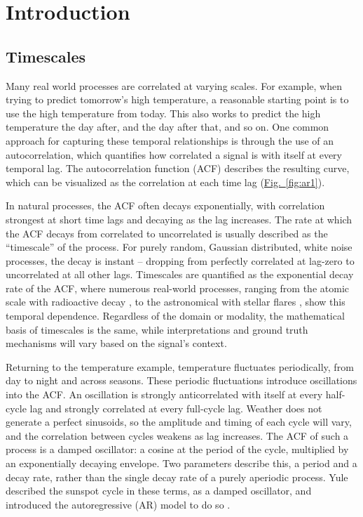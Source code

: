 \documentclass[pdflatex,lineno,sn-nature]{sn-jnl}
\newcommand{\figpanel}[3][]{\hyperref[#2]{Fig.~#1\ref*{#2}#3}}
\theoremstyle{thmstyleone}
\theoremstyle{thmstyletwo}
\theoremstyle{thmstylethree}
\begin{document}
\maketitle

\section{Introduction}\label{sec:intro}

\subsection{Timescales}\label{sec:timescales}

Many real world processes are correlated at varying scales. For example, when trying to predict tomorrow's high temperature, a reasonable starting point is to use the high temperature from today. This also works to predict the high temperature the day after, and the day after that, and so on. One common approach for capturing these temporal relationships is through the use of an autocorrelation, which quantifies how correlated a signal is with itself at every temporal lag. The autocorrelation function (ACF) describes the resulting curve, which can be visualized as the correlation at each time lag (\figpanel{fig:ar1}{}).

In natural processes, the ACF often decays exponentially, with correlation strongest at short time lags and decaying as the lag increases. The rate at which the ACF decays from correlated to uncorrelated is usually described as the ``timescale'' of the process. For purely random, Gaussian distributed, white noise processes, the decay is instant -- dropping from perfectly correlated at lag-zero to uncorrelated at all other lags. Timescales are quantified as the exponential decay rate of the ACF, where numerous real-world processes, ranging from the atomic scale with radioactive decay \cite{semkow_oscillations_2009}, to the astronomical with stellar flares \cite{anfinogentov_decaying_2013}, show this temporal dependence. Regardless of the domain or modality, the mathematical basis of timescales is the same, while interpretations and ground truth mechanisms will vary based on the signal's context.

Returning to the temperature example, temperature fluctuates periodically, from day to night and across seasons. These periodic fluctuations introduce oscillations into the ACF. An oscillation is strongly anticorrelated with itself at every half-cycle lag and strongly correlated at every full-cycle lag. Weather does not generate a perfect sinusoids, so the amplitude and timing of each cycle will vary, and the correlation between cycles weakens as lag increases. The ACF of such a process is a damped oscillator: a cosine at the period of the cycle, multiplied by an exponentially decaying envelope. Two parameters describe this, a period and a decay rate, rather than the single decay rate of a purely aperiodic process. Yule described the sunspot cycle in these terms, as a damped oscillator, and introduced the autoregressive (AR) model to do so \cite{yule_1927}.
\end{document}
